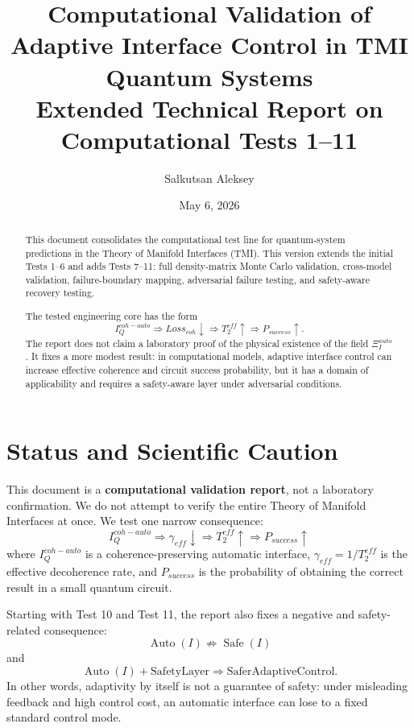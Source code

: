 \documentclass[12pt,a4paper]{article}
\title{\textbf{Computational Validation of Adaptive Interface Control in TMI Quantum Systems}\\
\large Extended Technical Report on Computational Tests 1--11}
\author{Salkutsan Aleksey}
\date{May 6, 2026}
\newcommand{\Auto}{\operatorname{Auto}}
\newcommand{\Safe}{\operatorname{Safe}}
\begin{document}
\maketitle

\begin{abstract}
This document consolidates the computational test line for quantum-system predictions in the Theory of Manifold Interfaces (TMI). This version extends the initial Tests 1--6 and adds Tests 7--11: full density-matrix Monte Carlo validation, cross-model validation, failure-boundary mapping, adversarial failure testing, and safety-aware recovery testing.

The tested engineering core has the form
\[
I_Q^{coh-auto}\Rightarrow Loss_{coh}\downarrow\Rightarrow T_2^{eff}\uparrow\Rightarrow P_{success}\uparrow.
\]
The report does not claim a laboratory proof of the physical existence of the field $\Xi_I^{auto}$. It fixes a more modest result: in computational models, adaptive interface control can increase effective coherence and circuit success probability, but it has a domain of applicability and requires a safety-aware layer under adversarial conditions.
\end{abstract}

\tableofcontents
\newpage

\section{Status and Scientific Caution}

This document is a \textbf{computational validation report}, not a laboratory confirmation. We do not attempt to verify the entire Theory of Manifold Interfaces at once. We test one narrow consequence:
\[
\boxed{
I_Q^{coh-auto}
\Rightarrow
\gamma_{eff}\downarrow
\Rightarrow
T_2^{eff}\uparrow
\Rightarrow
P_{success}\uparrow
}
\]
where $I_Q^{coh-auto}$ is a coherence-preserving automatic interface, $\gamma_{eff}=1/T_2^{eff}$ is the effective decoherence rate, and $P_{success}$ is the probability of obtaining the correct result in a small quantum circuit.

Starting with Test 10 and Test 11, the report also fixes a negative and safety-related consequence:
\[
\boxed{\Auto(I)\not\Rightarrow \Safe(I)}
\]
and
\[
\boxed{\Auto(I)+\text{SafetyLayer}\Rightarrow \text{SaferAdaptiveControl}.}
\]
In other words, adaptivity by itself is not a guarantee of safety: under misleading feedback and high control cost, an automatic interface can lose to a fixed standard control mode.
\end{document}
